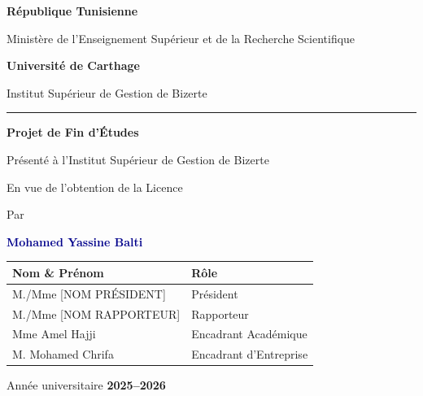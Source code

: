 \documentclass[12pt,a4paper]{report}
\begin{document}

\begin{titlepage}
\centering
{\Large \textbf{République Tunisienne}}\par
{\large Ministère de l'Enseignement Supérieur et de la Recherche Scientifique}\par
\vspace{0.3cm}
{\Large \textbf{Université de Carthage}}\par
{\large Institut Supérieur de Gestion de Bizerte}\par
\vspace{1.5cm}
\textcolor{darkblue}{\rule{\linewidth}{1.5pt}}\par
\vspace{0.8cm}
{\LARGE \textbf{Projet de Fin d'Études}}\par
\vspace{0.5cm}
{\large Présenté à l'Institut Supérieur de Gestion de Bizerte}\par
{\large En vue de l'obtention de la Licence}\par
\vspace{0.8cm}
{\large Par}\par
\vspace{0.3cm}
{\Huge \textbf{\textcolor{darkblue}{Mohamed Yassine Balti}}}\par
\vspace{1cm}
\par
\vspace{1.5cm}
\begin{tabular}{ll}
\toprule
\textbf{Nom \& Prénom} & \textbf{Rôle} \\
\midrule
M./Mme [NOM PRÉSIDENT]      & Président \\
M./Mme [NOM RAPPORTEUR]     & Rapporteur \\
Mme Amel Hajji              & Encadrant Académique \\
M. Mohamed Chrifa           & Encadrant d'Entreprise \\
\bottomrule
\end{tabular}\par
\vfill
{\large Année universitaire \textbf{2025--2026}}
\end{titlepage}
\end{document}
